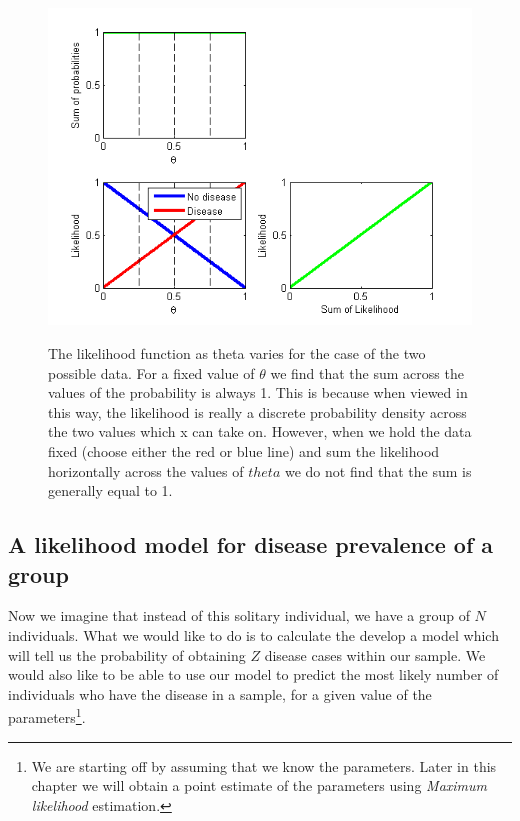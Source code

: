 \documentclass[11pt,fullpage]{book}
\begin{document}
\begin{figure}
\centering
\scalebox{0.75} 
{\includegraphics{likelihood_bernoulli.png}}
\caption{The likelihood function as theta varies for the case of the two possible data. For a fixed value of $\theta$ we find that the sum across the values of the probability is always 1. This is because when viewed in this way, the likelihood is really a discrete probability density across the two values which x can take on. However, when we hold the data fixed (choose either the red or blue line) and sum the likelihood horizontally across the values of $theta$ we do not find that the sum is generally equal to 1. }\label{fig:Likelihood_bernoulli}
\end{figure}

\subsection{A likelihood model for disease prevalence of a group}
Now we imagine that instead of this solitary individual, we have a group of $N$ individuals. What we would like to do is to calculate the develop a model which will tell us the probability of obtaining $Z$ disease cases within our sample. We would also like to be able to use our model to predict the most likely number of individuals who have the disease in a sample, for a given value of the parameters\footnote{We are starting off by assuming that we know the parameters. Later in this chapter we will obtain a point estimate of the parameters using \textit{Maximum likelihood} estimation.}. 
\end{document}
